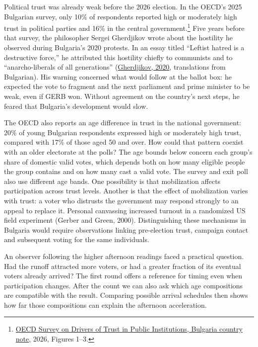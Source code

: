 \documentclass[11pt,a4paper]{article}
\begin{document}
Political trust was already weak before the 2026 election. In the OECD's 2025 Bulgarian survey, only 10\% of respondents reported high or moderately high trust in political parties and 16\% in the central government.\footnote{\href{https://www.oecd.org/en/publications/oecd-survey-on-drivers-of-trust-in-public-institutions-2026-results_c88c8869-en/bulgaria_31bcfcc8-en.html}{OECD Survey on Drivers of Trust in Public Institutions, Bulgaria country note}, 2026, Figures 1--3.} Five years before that survey, the philosopher Sergei Gherdjikov wrote about the hostility he observed during Bulgaria's 2020 protests. In an essay titled ``Leftist hatred is a destructive force,'' he attributed this hostility chiefly to communists and to ``anarcho-liberals of all generations'' (\hyperlink{ref-gherdjikov}{Gherdjikov, 2020}, translations from Bulgarian). His warning concerned what would follow at the ballot box: he expected the vote to fragment and the next parliament and prime minister to be weak, even if GERB won. Without agreement on the country's next steps, he feared that Bulgaria's development would slow. 

The OECD also reports an age difference in trust in the national government: 20\% of young Bulgarian respondents expressed high or moderately high trust, compared with 17\% of those aged 50 and over. How could that pattern coexist with an older electorate at the polls? The age bounds below concern each group's share of domestic valid votes, which depends both on how many eligible people the group contains and on how many cast a valid vote. The survey and exit poll also use different age bands. One possibility is that mobilization affects participation across trust levels. Another is that the effect of mobilization varies with trust: a voter who distrusts the government may respond strongly to an appeal to replace it. Personal canvassing increased turnout in a randomized US field experiment (Gerber and Green, 2000). Distinguishing these mechanisms in Bulgaria would require observations linking pre-election trust, campaign contact and subsequent voting for the same individuals.

An observer following the higher afternoon readings faced a practical question. Had the runoff attracted more voters, or had a greater fraction of its eventual voters already arrived? The first round offers a reference for timing even when participation changes. After the count we can also ask which age compositions are compatible with the result. Comparing possible arrival schedules then shows how far those compositions can explain the afternoon acceleration.
\end{document}
